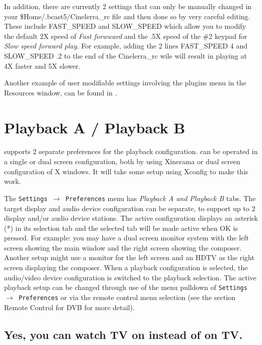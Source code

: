 In addition, there are currently 2 settings that can only be manually changed in your \$Home/.bcast5/Cinelerra\_rc file and then done so by very careful editing.  These include FAST\_SPEED and SLOW\_SPEED which allow you to modify the default 2X speed of \textit{Fast forwward} and the .5X speed of the \#2 keypad for \textit{Slow speed forward play}.
For example, adding the 2 lines FAST\_SPEED 4 and SLOW\_SPEED .2 to the end of the Cinelerra\_rc wile will result in playing at 4X faster and 5X slower.

Another example of user modifiable settings involving the plugins menu in the Resources window, can be found in .

\section{Playback A / Playback B}%
\label{sec:playback_a_b}

\CGG{} supports 2 separate preferences for the playback configuration.  \CGG{} can be operated in a single or dual screen configuration, both by using Xinerama or dual screen configuration of X windows.  It will take some setup using Xconfig to make this work.

The \texttt{Settings $\rightarrow$ Preferences} menu has \textit{Playback A and Playback B} tabs.  The target display and audio device configuration can be separate, to support up to 2 display and/or audio device stations.  The active configuration displays an asterisk (*) in its selection tab and the selected tab will be made active when OK is pressed.  For example: you may have a dual screen monitor system with the left screen showing the \CGG{} main window and the right screen showing the composer.  Another setup might use a monitor for the left screen and an HDTV as the right screen displaying the composer.  When a playback configuration is selected, the audio/video device configuration is switched to the playback selection.  The active playback setup can be changed through use of the menu pulldown of \texttt{Settings $\rightarrow$ Preferences} or via the remote control menu selection (see the section Remote Control for DVB for more detail). 

\subsection*{Yes, you can watch TV on \CGG{} instead of \CGG{} on TV.}%
\label{sub:watch_tv_on_cinelerra}

